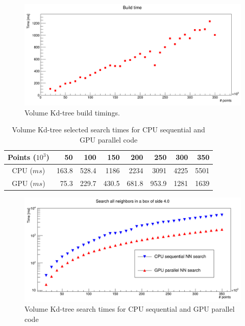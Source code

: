 \begin{figure}
\includegraphics[width=\textwidth]{volumeKdPlot/volumeBuildTime.png}
\caption{Volume Kd-tree build timings.}
\label{volume_kdtree_plot}
\end{figure}

\begin{center}
\begin{table}[h]
\begin{tabular}{ c || r r r r r r r }
Points ($10^{3}$) & 50 & 100 & 150 & 200 & 250 & 300 & 350 \\
\hline
CPU ($\unit{ms}$) & 163.8 & 528.4 & 1186 & 2234 & 3091 & 4225 & 5501 \\
GPU ($\unit{ms}$) & 75.3 & 229.7 & 430.5 & 681.8 & 953.9 & 1281 & 1639 \\
\end{tabular}
\caption{Volume Kd-tree selected search times for CPU sequential and GPU parallel code}
\label{volume_kd_tree_tab}
\end{table}
\end{center}

\begin{figure}
\includegraphics[width=\textwidth]{volumeKdPlot/volumeKdTree.png}
\caption{Volume Kd-tree search times for CPU sequential and GPU parallel code}
\label{volume_kdtree_plot}
\end{figure}


